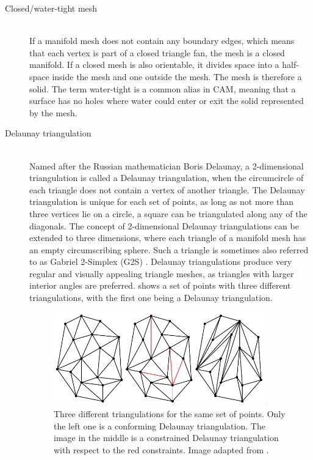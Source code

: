 \begin{description}
	\item[Closed/water-tight mesh] \hfill \\
	If a manifold mesh does not contain any boundary edges, which means that each vertex is part of a closed triangle fan, the mesh is a closed manifold.
	If a closed mesh is also orientable, it divides space into a half-space inside the mesh and one outside the mesh.
	The mesh is therefore a solid.
	The term water-tight is a common alias in CAM, meaning that a surface has no holes where water could enter or exit the solid represented by the mesh.




	\item[Delaunay triangulation] \hfill \\
	Named after the Russian mathematician Boris Delaunay, a 2-dimensional triangulation is called a Delaunay triangulation, when the circumcircle of each triangle does not contain a vertex of another triangle.
	The Delaunay triangulation is unique for each set of points, as long as not more than three vertices lie on a circle, \eg a square can be triangulated along any of the diagonals.
	The concept of 2-dimensional Delaunay triangulations can be extended to three dimensions, where each triangle of a manifold mesh has an empty circumscribing sphere.
	Such a triangle is sometimes also referred to as Gabriel 2-Simplex (G2S) \cite{g2s}.
	Delaunay triangulations produce very regular and visually appealing triangle meshes, as triangles with larger interior angles are preferred.
	 shows a set of points with three different triangulations, with the first one being a Delaunay triangulation.

	\begin{figure}[H]
		\centering
		\includegraphics[width=0.9\textwidth]{images/delaunay_triangulation}
		\caption[Delaunay triangulations]{
			Three different triangulations for the same set of points.
			Only the left one is a conforming Delaunay triangulation.
			The image in the middle is a constrained Delaunay triangulation with respect to the red constraints.
			Image adapted from \cite{delaunay_image}.
		}
		\label{fig:delaunay_triangulation}
	\end{figure}



\end{description}
